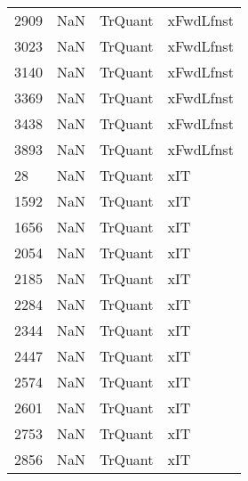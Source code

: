 \begin{tabular}{llll}
2909 &                   NaN &                    TrQuant &                                 xFwdLfnst \\
3023 &                   NaN &                    TrQuant &                                 xFwdLfnst \\
3140 &                   NaN &                    TrQuant &                                 xFwdLfnst \\
3369 &                   NaN &                    TrQuant &                                 xFwdLfnst \\
3438 &                   NaN &                    TrQuant &                                 xFwdLfnst \\
3893 &                   NaN &                    TrQuant &                                 xFwdLfnst \\
28   &                   NaN &                    TrQuant &                                       xIT \\
1592 &                   NaN &                    TrQuant &                                       xIT \\
1656 &                   NaN &                    TrQuant &                                       xIT \\
2054 &                   NaN &                    TrQuant &                                       xIT \\
2185 &                   NaN &                    TrQuant &                                       xIT \\
2284 &                   NaN &                    TrQuant &                                       xIT \\
2344 &                   NaN &                    TrQuant &                                       xIT \\
2447 &                   NaN &                    TrQuant &                                       xIT \\
2574 &                   NaN &                    TrQuant &                                       xIT \\
2601 &                   NaN &                    TrQuant &                                       xIT \\
2753 &                   NaN &                    TrQuant &                                       xIT \\
2856 &                   NaN &                    TrQuant &                                       xIT \\

\end{tabular}

